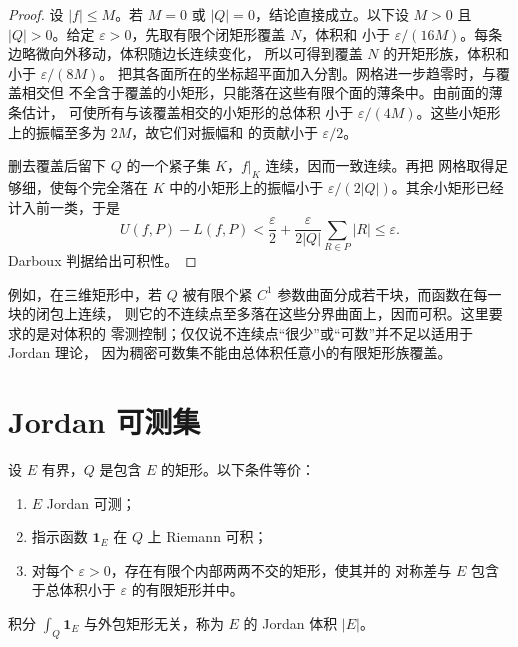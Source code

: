 \begin{proof}
设 $|f|\le M$。若 $M=0$ 或 $|Q|=0$，结论直接成立。以下设 $M>0$ 且
$|Q|>0$。给定 $\varepsilon>0$，先取有限个闭矩形覆盖 $N$，体积和
小于 $\varepsilon/(16M)$。每条边略微向外移动，体积随边长连续变化，
所以可得到覆盖 $N$ 的开矩形族，体积和小于 $\varepsilon/(8M)$。
把其各面所在的坐标超平面加入分割。网格进一步趋零时，与覆盖相交但
不全含于覆盖的小矩形，只能落在这些有限个面的薄条中。由前面的薄条估计，
可使所有与该覆盖相交的小矩形的总体积
小于 $\varepsilon/(4M)$。这些小矩形上的振幅至多为 $2M$，故它们对振幅和
的贡献小于 $\varepsilon/2$。

删去覆盖后留下 $Q$ 的一个紧子集 $K$，$f|_K$ 连续，因而一致连续。再把
网格取得足够细，使每个完全落在 $K$ 中的小矩形上的振幅小于
$\varepsilon/(2|Q|)$。其余小矩形已经计入前一类，于是
\[
 U(f,P)-L(f,P)<\frac{\varepsilon}{2}
 +\frac{\varepsilon}{2|Q|}\sum_{R\in P}|R|\le\varepsilon.
\]
Darboux 判据给出可积性。
\end{proof}

例如，在三维矩形中，若 $Q$ 被有限个紧 $C^1$ 参数曲面分成若干块，而函数在每一块的闭包上连续，
则它的不连续点至多落在这些分界曲面上，因而可积。这里要求的是对体积的
零测控制；仅仅说不连续点“很少”或“可数”并不足以适用于 Jordan 理论，
因为稠密可数集不能由总体积任意小的有限矩形族覆盖。

\section{Jordan 可测集}

\begin{theorem}[集合判据]
\label{thm:jordan-indicator-boundary}
设 $E$ 有界，$Q$ 是包含 $E$ 的矩形。以下条件等价：
\begin{enumerate}[label=\textup{(\roman*)}]
 \item $E$ Jordan 可测；
 \item 指示函数 $\mathbf1_E$ 在 $Q$ 上 Riemann 可积；
 \item 对每个 $\varepsilon>0$，存在有限个内部两两不交的矩形，使其并的
 对称差与 $E$ 包含于总体积小于 $\varepsilon$ 的有限矩形并中。
\end{enumerate}
积分 $\int_Q\mathbf1_E$ 与外包矩形无关，称为 $E$ 的 Jordan 体积
$|E|$。
\end{theorem}

